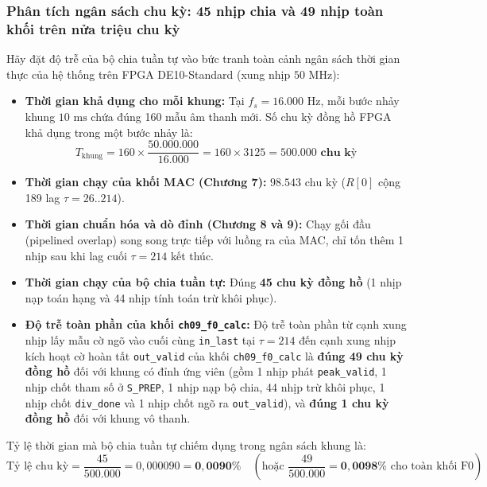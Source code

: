\subsubsection*{Phân tích ngân sách chu kỳ: 45 nhịp chia và 49 nhịp toàn khối trên nửa triệu chu kỳ}
Hãy đặt độ trễ của bộ chia tuần tự vào bức tranh toàn cảnh ngân sách thời gian thực của hệ thống trên FPGA DE10-Standard (xung nhịp $50\text{ MHz}$):
\begin{itemize}[leftmargin=1.5em, itemsep=2pt]
    \item \textbf{Thời gian khả dụng cho mỗi khung:} Tại $f_s = 16.000\text{ Hz}$, mỗi bước nhảy khung $10\text{ ms}$ chứa đúng 160 mẫu âm thanh mới. Số chu kỳ đồng hồ FPGA khả dụng trong một bước nhảy là:
    \begin{equation}
    T_{\text{khung}} = 160 \times \frac{50.000.000}{16.000} = 160 \times 3125 = \mathbf{500.000\text{ chu kỳ}}
    \end{equation}
    \item \textbf{Thời gian chạy của khối MAC (Chương 7):} $98.543\text{ chu kỳ}$ ($R[0]$ cộng 189 lag $\tau = 26..214$).
    \item \textbf{Thời gian chuẩn hóa và dò đỉnh (Chương 8 và 9):} Chạy gối đầu (pipelined overlap) song song trực tiếp với luồng ra của MAC, chỉ tốn thêm 1 nhịp sau khi lag cuối $\tau = 214$ kết thúc.
    \item \textbf{Thời gian chạy của bộ chia tuần tự:} Đúng \textbf{45 chu kỳ đồng hồ} (1 nhịp nạp toán hạng và 44 nhịp tính toán trừ khôi phục).
    \item \textbf{Độ trễ toàn phần của khối \texttt{ch09\_f0\_calc}:} Độ trễ toàn phần từ cạnh xung nhịp lấy mẫu cờ ngõ vào cuối cùng \texttt{in\_last} tại $\tau = 214$ đến cạnh xung nhịp kích hoạt cờ hoàn tất \texttt{out\_valid} của khối \texttt{ch09\_f0\_calc} là \textbf{đúng 49 chu kỳ đồng hồ} đối với khung có đỉnh ứng viên (gồm 1 nhịp phát \texttt{peak\_valid}, 1 nhịp chốt tham số ở \texttt{S\_PREP}, 1 nhịp nạp bộ chia, 44 nhịp trừ khôi phục, 1 nhịp chốt \texttt{div\_done} và 1 nhịp chốt ngõ ra \texttt{out\_valid}), và \textbf{đúng 1 chu kỳ đồng hồ} đối với khung vô thanh.
\end{itemize}

Tỷ lệ thời gian mà bộ chia tuần tự chiếm dụng trong ngân sách khung là:
\begin{equation}
\text{Tỷ lệ chu kỳ} = \frac{45}{500.000} = 0{,}000090 = \mathbf{0{,}0090\%} \quad \left(\text{hoặc } \frac{49}{500.000} = \mathbf{0{,}0098\%} \text{ cho toàn khối F0}\right)
\end{equation}

